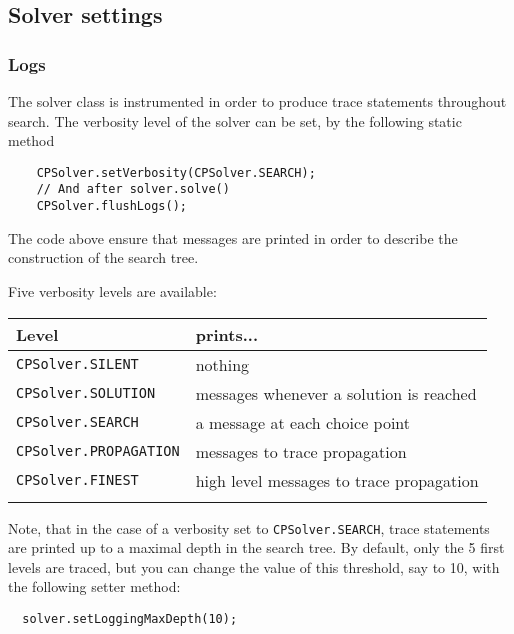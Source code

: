 \subsection{Solver settings}\label{solver:solversettings}\hypertarget{solver:solversettings}{}

\subsubsection{Logs}\label{solver:logs}\hypertarget{solver:logs}{}
The solver class is instrumented in order to produce trace statements throughout search. The verbosity level of the solver can be set, by the following static method
\begin{lstlisting}
	CPSolver.setVerbosity(CPSolver.SEARCH);
	// And after solver.solve()
	CPSolver.flushLogs();
\end{lstlisting}

The code above ensure that messages are printed in order to describe the construction of the search tree.

Five verbosity levels are available:

\noindent\begin{tabular}{p{.4\linewidth}p{.6\linewidth}}
  \hline
  Level & prints... \\
  \hline
 \texttt{CPSolver.SILENT} & nothing\\
 \texttt{CPSolver.SOLUTION} & messages whenever a solution is reached\\
 \texttt{CPSolver.SEARCH} & a message at each choice point\\
 \texttt{CPSolver.PROPAGATION} & messages to trace propagation\\
 \texttt{CPSolver.FINEST} & high level messages to trace propagation\\
\hline\\
\end{tabular}

Note, that in the case of a verbosity set to \texttt{CPSolver.SEARCH}, trace statements are printed up to a maximal depth in the search tree. By default, only the 5 first levels are traced, but you can change the value of this threshold, say to 10, with the following setter method:
\begin{lstlisting}
  solver.setLoggingMaxDepth(10);
\end{lstlisting}

